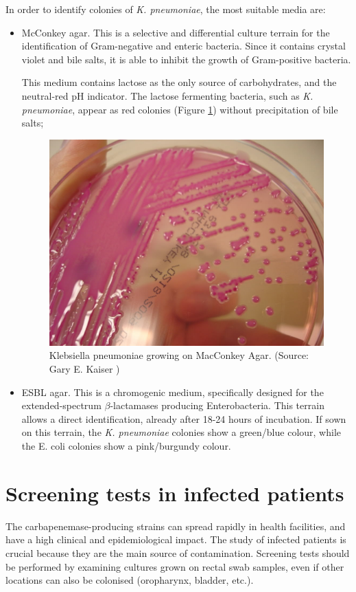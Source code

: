 \documentclass[11pt]{report}
\begin{document}
In order to identify colonies of \emph{K. pneumoniae}, the most suitable media are:
\begin{itemize}
\item McConkey agar.
This is a selective and differential culture terrain for the identification of Gram-negative and enteric bacteria.
Since it contains crystal violet and bile salts, it is able to inhibit the growth of Gram-positive bacteria.

This medium contains lactose as the only source of carbohydrates, and the neutral-red pH indicator.
The lactose fermenting bacteria, such as \emph{K. pneumoniae}, appear as red colonies (Figure \ref{klebsiellaMac}) without precipitation of bile salts;

\begin{figure}[htp]
\centering
\includegraphics[scale=0.250]{img/klebsiellaMac.jpg}
\caption{Klebsiella pneumoniae growing on MacConkey Agar. (Source: Gary E. Kaiser \cite{klebsiellaMac})}
\label{klebsiellaMac}
\end{figure}

\clearpage
\item ESBL agar.
This is a chromogenic medium, specifically designed for the extended-spectrum $\beta$-lactamases producing Enterobacteria.
This terrain allows a direct identification, already after 18-24 hours of incubation.
If sown on this terrain, the \emph{K. pneumoniae} colonies show a green/blue colour, while the E. coli colonies show a pink/burgundy colour.
\end{itemize}

\section{Screening tests in infected patients}
The carbapenemase-producing strains can spread rapidly in health facilities, and have a high clinical and epidemiological impact.
The study of infected patients is crucial because they are the main source of contamination.
Screening tests should be performed by examining cultures grown on rectal swab samples, even if other locations can also be colonised (oropharynx, bladder, etc.).
\end{document}
